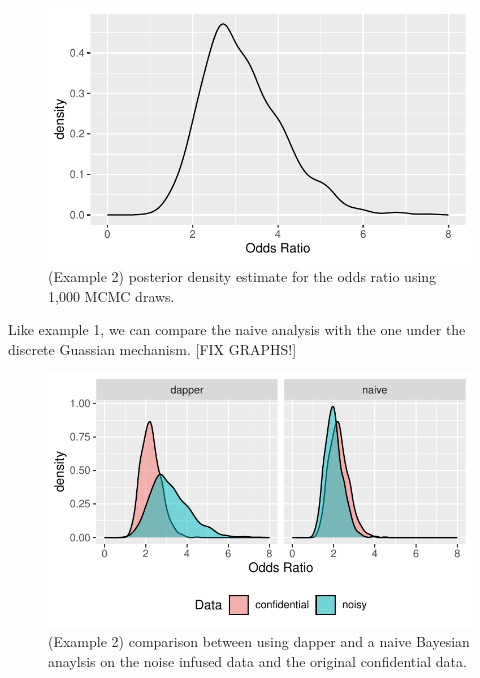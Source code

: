 \begin{figure}

{\centering \includegraphics{dppaper_files/figure-latex/post-or-density-dg-1} 

}

\caption{(Example 2) posterior density estimate for the odds ratio using 1,000 MCMC draws.}\label{fig:post-or-density-dg}
\end{figure}

Like example 1, we can compare the naive analysis with the one under
the discrete Guassian mechanism. {[}FIX GRAPHS!{]}

\begin{figure}

{\centering \includegraphics{dppaper_files/figure-latex/post-or-compare-dg-1} 

}

\caption{(Example 2) comparison between using dapper and a naive Bayesian anaylsis on the
noise infused data and the original confidential data.}\label{fig:post-or-compare-dg}
\end{figure}

